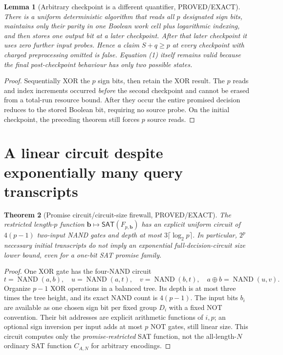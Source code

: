 \documentclass[11pt]{article}
\newtheorem{theorem}{Theorem}
\newtheorem{lemma}[theorem]{Lemma}
\newcommand{\SAT}{\mathsf{SAT}}
\begin{document}
\begin{lemma}[Arbitrary checkpoint is a different quantifier, PROVED/EXACT]
There is a uniform deterministic algorithm that reads all $p$ designated sign bits, maintains only their parity in one Boolean work cell plus logarithmic indexing, and then stores one output bit at a later checkpoint. After that later checkpoint it uses zero further input probes. Hence a claim $S+q\ge p$ at \emph{every} checkpoint with charged preprocessing omitted is false. Equation (1) itself remains valid because the final post-checkpoint behaviour has only two possible states.
\end{lemma}
\begin{proof}
Sequentially XOR the $p$ sign bits, then retain the XOR result. The $p$ reads and index increments occurred \emph{before} the second checkpoint and cannot be erased from a total-run resource bound. After they occur the entire promised decision reduces to the stored Boolean bit, requiring no source probe. On the initial checkpoint, the preceding theorem still forces $p$ source reads.
\end{proof}

\section{A linear circuit despite exponentially many query transcripts}
\begin{theorem}[Promise circuit/circuit-size firewall, PROVED/EXACT]
The restricted length-$p$ function $\mathbf b\mapsto\SAT(F_{p,\mathbf b})$ has an explicit \emph{uniform} circuit of $4(p-1)$ two-input NAND gates and depth at most $3\lceil\log_2p\rceil$. In particular, $2^p$ necessary initial transcripts do \emph{not} imply an exponential full-decision-circuit size lower bound, even for a one-bit SAT promise family.
\end{theorem}
\begin{proof}
One XOR gate has the four-NAND circuit
\[
 t=\operatorname{NAND}(a,b),\quad
 u=\operatorname{NAND}(a,t),\quad
 v=\operatorname{NAND}(b,t),\quad
 a\oplus b=\operatorname{NAND}(u,v).
\]
Organize $p-1$ XOR operations in a balanced tree. Its depth is at most three times the tree height, and its exact NAND count is $4(p-1)$. The input bits $b_i$ are available as one chosen sign bit per fixed group $D_i$ with a fixed NOT convention. Their bit addresses are explicit arithmetic functions of $i,p$; an optional sign inversion per input adds at most $p$ NOT gates, still linear size. This circuit computes only the \emph{promise-restricted} SAT function, not the all-length-$N$ ordinary SAT function $C_{A,N}$ for arbitrary encodings.
\end{proof}
\end{document}
